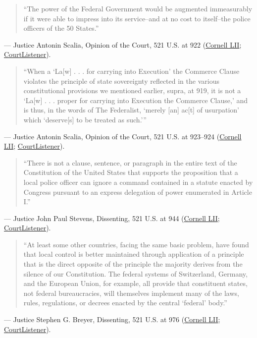 \documentclass[12pt]{article}
\begin{document}
\begin{quote}
``The power of the Federal Government would be augmented immeasurably if it were able to impress into its service--and at no cost to itself--the police officers of the 50 States.''
\end{quote}
\noindent --- Justice Antonin Scalia, Opinion of the Court, 521 U.S. at 922 (\href{https://www.law.cornell.edu/supct/html/95-1478.ZO.html}{Cornell LII}; \href{https://www.courtlistener.com/opinion/118148/printz-v-united-states/}{CourtListener}).

\begin{quote}
``When a `La[w] . . . for carrying into Execution' the Commerce Clause violates the principle of state sovereignty reflected in the various constitutional provisions we mentioned earlier, supra, at 919, it is not a `La[w] . . . proper for carrying into Execution the Commerce Clause,' and is thus, in the words of The Federalist, `merely [an] ac[t] of usurpation' which `deserve[s] to be treated as such.'''
\end{quote}
\noindent --- Justice Antonin Scalia, Opinion of the Court, 521 U.S. at 923--924 (\href{https://www.law.cornell.edu/supct/html/95-1478.ZO.html}{Cornell LII}; \href{https://www.courtlistener.com/opinion/118148/printz-v-united-states/}{CourtListener}).

\begin{quote}
``There is not a clause, sentence, or paragraph in the entire text of the Constitution of the United States that supports the proposition that a local police officer can ignore a command contained in a statute enacted by Congress pursuant to an express delegation of power enumerated in Article I.''
\end{quote}
\noindent --- Justice John Paul Stevens, Dissenting, 521 U.S. at 944 (\href{https://www.law.cornell.edu/supct/html/95-1478.ZD.html}{Cornell LII}; \href{https://www.courtlistener.com/opinion/118148/printz-v-united-states/}{CourtListener}).

\begin{quote}
``At least some other countries, facing the same basic problem, have found that local control is better maintained through application of a principle that is the direct opposite of the principle the majority derives from the silence of our Constitution. The federal systems of Switzerland, Germany, and the European Union, for example, all provide that constituent states, not federal bureaucracies, will themselves implement many of the laws, rules, regulations, or decrees enacted by the central `federal' body.''
\end{quote}
\noindent --- Justice Stephen G. Breyer, Dissenting, 521 U.S. at 976 (\href{https://www.law.cornell.edu/supct/html/95-1478.ZD2.html}{Cornell LII}; \href{https://www.courtlistener.com/opinion/118148/printz-v-united-states/}{CourtListener}).
\end{document}

